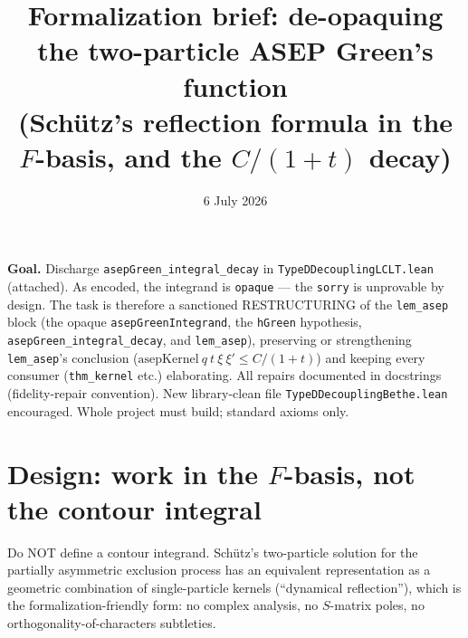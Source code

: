 \documentclass[11pt]{article}
\title{Formalization brief: de-opaquing the two-particle ASEP Green's function\\
(Sch\"utz's reflection formula in the $F$-basis, and the $C/(1+t)$ decay)}
\date{6 July 2026}
\theoremstyle{plain}
\theoremstyle{remark}
\begin{document}
\maketitle

\noindent\textbf{Goal.} Discharge \texttt{asepGreen\_integral\_decay} in
\texttt{TypeDDecouplingLCLT.lean} (attached). As encoded, the integrand is
\texttt{opaque} --- the \texttt{sorry} is unprovable by design. The task is
therefore a sanctioned RESTRUCTURING of the \texttt{lem\_asep} block (the
opaque \texttt{asepGreenIntegrand}, the \texttt{hGreen} hypothesis,
\texttt{asepGreen\_integral\_decay}, and \texttt{lem\_asep}), preserving or
strengthening \texttt{lem\_asep}'s conclusion
($\mathrm{asepKernel}\ q\ t\ \xi\ \xi'\le C/(1+t)$) and keeping every consumer
(\texttt{thm\_kernel} etc.) elaborating. All repairs documented in docstrings
(fidelity-repair convention). New library-clean file
\texttt{TypeDDecouplingBethe.lean} encouraged. Whole project must build;
standard axioms only.

\section*{Design: work in the $F$-basis, not the contour integral}

Do NOT define a contour integrand. Sch\"utz's two-particle solution for the
partially asymmetric exclusion process has an equivalent representation as a
geometric combination of single-particle kernels (``dynamical reflection''),
which is the formalization-friendly form: no complex analysis, no $S$-matrix
poles, no orthogonality-of-characters subtleties.
\end{document}
